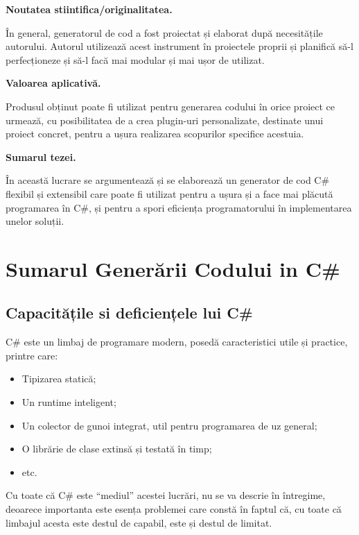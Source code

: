 \documentclass{report}
\begin{document}
\textbf{Noutatea stiintifica/originalitatea.}

În general, generatorul de cod a fost proiectat și elaborat după necesitățile autorului.
Autorul utilizează acest instrument în proiectele proprii și planifică să-l perfecționeze și să-l facă mai modular și mai ușor de utilizat.

\textbf{Valoarea aplicativă.}

Produsul obținut poate fi utilizat pentru generarea codului în orice proiect ce urmează,
cu posibilitatea de a crea plugin-uri personalizate, destinate unui proiect concret,
pentru a ușura realizarea scopurilor specifice acestuia.

\textbf{Sumarul tezei.}

În această lucrare se argumentează și se elaborează un generator de cod C\# flexibil și extensibil care poate fi utilizat pentru a ușura și a face mai plăcută programarea în C\#, și pentru a spori eficiența programatorului în implementarea unelor soluții.

\chapter{Sumarul Generării Codului in C\#}

\section{Capacitățile si deficiențele lui C\#}


{C\# este un limbaj de programare modern, posedă caracteristici utile și practice}\cite{tour_of_csharp}, printre care:
\begin{itemize}
  \item Tipizarea statică;
  \item Un runtime inteligent;
  \item Un colector de gunoi integrat, util pentru programarea de uz general;
  \item O librărie de clase extinsă și testată în timp;
  \item etc.
\end{itemize}

Cu toate că C\# este ``mediul'' acestei lucrări, nu se va descrie în întregime,
deoarece importanta este esența problemei care constă în faptul că, cu toate că limbajul acesta este destul de capabil, este și destul de limitat.
\end{document}
